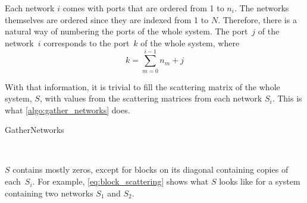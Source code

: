 Each network $i$ comes with ports that are ordered from 1 to $n_i$.
The networks themselves are ordered since they are indexed from 1 to $N$.
Therefore, there is a natural way of numbering the ports of the whole system.
The port~$j$ of the network~$i$ corresponds to the port~$k$ of the whole system, where
\begin{equation}
    k = \sum_{m=0}^{i - 1}n_m + j \label{eq:port_numbering}
\end{equation}

With that information, it is trivial to fill the scattering matrix of the whole system, $S$, with values from the scattering matrices from each network $S_i$.
This is what \cref{algo:gather_networks} does.
\begin{algorithm}
    \caption{GatherNetworks}
    \label{algo:gather_networks}
    \begin{algorithmic}
         
         
        \State{}
                
        \EndFor
        \State{}
        \State{}
         
        \EndFor
        \\ 
        \EndFunction
    \end{algorithmic}
\end{algorithm}
$S$ contains mostly zeros, except for blocks on its diagonal containing copies of each~$S_i$.
For example, \cref{eq:block_scattering} shows what $S$ looks like for a system containing two networks $S_1$ and $S_2$.
